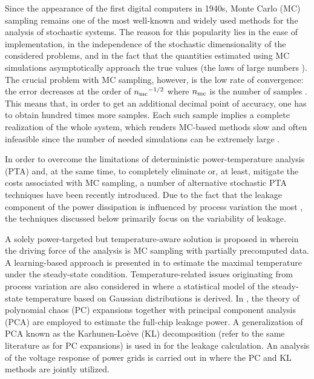 Since the appearance of the first digital computers in 1940s, Monte Carlo (MC) sampling remains one of the most well-known and widely used methods for the analysis of stochastic systems.
The reason for this popularity lies in the ease of implementation, in the independence of the stochastic dimensionality of the considered problems, and in the fact that the quantities estimated using MC simulations asymptotically approach the true values (the laws of large numbers \cite{durrett2010}).
The crucial problem with MC sampling, however, is the low rate of convergence: the error decreases at the order of ${n_\text{mc}}^{-1/2}$ where ${n_\text{mc}}$ is the number of samples \cite{xiu2010, maitre2010}.
This means that, in order to get an additional decimal point of accuracy, one has to obtain hundred times more samples.
Each such sample implies a complete realization of the whole system, which renders MC-based methods slow and often infeasible since the number of needed simulations can be extremely large \cite{diaz-emparanza2002}.

In order to overcome the limitations of deterministic power-temperature analysis (PTA) and, at the same time, to completely eliminate or, at least, mitigate the costs associated with MC sampling, a number of alternative stochastic PTA techniques have been recently introduced.
Due to the fact that the leakage component of the power dissipation is influenced by process variation the most \cite{chandrakasan2001, srivastava2010, juan2011, juan2012}, the techniques discussed below primarily focus on the variability of leakage.

A solely power-targeted but temperature-aware solution is proposed in \cite{chandra2010} wherein the driving force of the analysis is MC sampling with partially precomputed data.
A learning-based approach is presented in \cite{juan2011} to estimate the maximal temperature under the steady-state condition.
Temperature-related issues originating from process variation are also considered in \cite{juan2012} where a statistical model of the steady-state temperature based on Gaussian distributions is derived.
In \cite{shen2009}, the theory of polynomial chaos (PC) expansions \cite{xiu2010, maitre2010, ghanem1991, eldred2008} together with principal component analysis (PCA) are employed to estimate the full-chip leakage power.
A generalization of PCA known as the Karhunen-Lo\`{e}ve (KL) decomposition (refer to the same literature as for PC expansions) is used in \cite{bhardwaj2006} for the leakage calculation.
An analysis of the voltage response of power grids is carried out in \cite{ghanta2006} where the PC and KL methods are jointly utilized.

